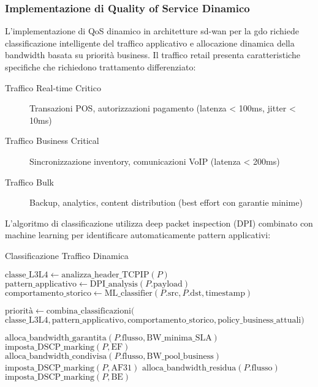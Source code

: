 \subsubsection{Implementazione di Quality of Service Dinamico}

L'implementazione di QoS dinamico in architetture \gls{sd-wan} per la \gls{gdo} richiede classificazione intelligente del traffico applicativo e allocazione dinamica della bandwidth basata su priorità business. Il traffico retail presenta caratteristiche specifiche che richiedono trattamento differenziato:

\begin{description}
    \item[Traffico Real-time Critico] Transazioni POS, autorizzazioni pagamento (latenza < 100ms, jitter < 10ms)
    \item[Traffico Business Critical] Sincronizzazione inventory, comunicazioni VoIP (latenza < 200ms)
    \item[Traffico Bulk] Backup, analytics, content distribution (best effort con garantie minime)
\end{description}

L'algoritmo di classificazione utilizza deep packet inspection (DPI) combinato con machine learning per identificare automaticamente pattern applicativi:

\begin{algorithm}[H]
\caption{Classificazione Traffico Dinamica}
\label{alg:classificazione-traffico}
\begin{algorithmic}[1]
    \State $\text{classe\_L3L4} \leftarrow \text{analizza\_header\_TCPIP}(P)$
    \State $\text{pattern\_applicativo} \leftarrow \text{DPI\_analysis}(P.\text{payload})$
    \State $\text{comportamento\_storico} \leftarrow \text{ML\_classifier}(P.\text{src}, P.\text{dst}, \text{timestamp})$
    
    \State $\text{priorità} \leftarrow \text{combina\_classificazioni}($
    \State \hspace{2em} $\text{classe\_L3L4}, \text{pattern\_applicativo}, \text{comportamento\_storico}, \text{policy\_business\_attuali})$
    
        \State $\text{alloca\_bandwidth\_garantita}(P.\text{flusso}, \text{BW\_minima\_SLA})$
        \State $\text{imposta\_DSCP\_marking}(P, \text{EF})$
        \State $\text{alloca\_bandwidth\_condivisa}(P.\text{flusso}, \text{BW\_pool\_business})$
        \State $\text{imposta\_DSCP\_marking}(P, \text{AF31})$
    \Else
        \State $\text{alloca\_bandwidth\_residua}(P.\text{flusso})$
        \State $\text{imposta\_DSCP\_marking}(P, \text{BE})$
    \EndIf
\EndFor
\end{algorithmic}
\end{algorithm}

